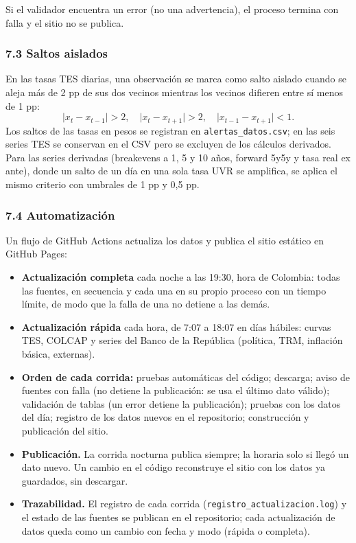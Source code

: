 Si el validador encuentra un error (no una advertencia), el proceso
termina con falla y el sitio no se publica.

\hypertarget{saltos-aislados}{%
\subsubsection{7.3 Saltos aislados}\label{saltos-aislados}}

En las tasas TES diarias, una observación se marca como salto aislado
cuando se aleja más de 2 pp de sus dos vecinos mientras los vecinos
difieren entre sí menos de 1 pp:
\[\lvert x_t-x_{t-1}\rvert>2,\quad \lvert x_t-x_{t+1}\rvert>2,\quad \lvert x_{t-1}-x_{t+1}\rvert<1.\]
Los saltos de las tasas en pesos se registran en
\texttt{alertas\_datos.csv}; en las seis series TES se conservan en el
CSV pero se excluyen de los cálculos derivados. Para las series
derivadas (breakevens a 1, 5 y 10 años, forward 5y5y y tasa real ex
ante), donde un salto de un día en una sola tasa UVR se amplifica, se
aplica el mismo criterio con umbrales de 1 pp y 0,5 pp.

\hypertarget{automatizaciuxf3n}{%
\subsubsection{7.4 Automatización}\label{automatizaciuxf3n}}

Un flujo de GitHub Actions actualiza los datos y publica el sitio
estático en GitHub Pages:

\begin{itemize}
\tightlist
\item
  \textbf{Actualización completa} cada noche a las 19:30, hora de
  Colombia: todas las fuentes, en secuencia y cada una en su propio
  proceso con un tiempo límite, de modo que la falla de una no detiene a
  las demás.
\item
  \textbf{Actualización rápida} cada hora, de 7:07 a 18:07 en días
  hábiles: curvas TES, COLCAP y series del Banco de la República
  (política, TRM, inflación básica, externas).
\item
  \textbf{Orden de cada corrida:} pruebas automáticas del código;
  descarga; aviso de fuentes con falla (no detiene la publicación: se
  usa el último dato válido); validación de tablas (un error detiene la
  publicación); pruebas con los datos del día; registro de los datos
  nuevos en el repositorio; construcción y publicación del sitio.
\item
  \textbf{Publicación.} La corrida nocturna publica siempre; la horaria
  solo si llegó un dato nuevo. Un cambio en el código reconstruye el
  sitio con los datos ya guardados, sin descargar.
\item
  \textbf{Trazabilidad.} El registro de cada corrida
  (\texttt{registro\_actualizacion.log}) y el estado de las fuentes se
  publican en el repositorio; cada actualización de datos queda como un
  cambio con fecha y modo (rápida o completa).
\end{itemize}

